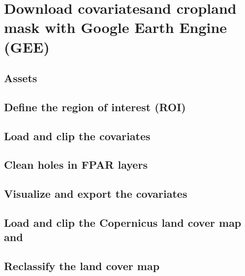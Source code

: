 \documentclass[
  10pt,
  b5paper,
  oneside]{book}
\begin{document}
\hypertarget{download-covariatesand-cropland-mask-with-google-earth-engine-gee}{%
\section{Download covariatesand cropland mask with Google Earth Engine (GEE)}\label{download-covariatesand-cropland-mask-with-google-earth-engine-gee}}

\hypertarget{assets}{%
\subsection{Assets}\label{assets}}

\hypertarget{define-the-region-of-interest-roi}{%
\subsection{Define the region of interest (ROI)}\label{define-the-region-of-interest-roi}}

\hypertarget{load-and-clip-the-covariates}{%
\subsection{Load and clip the covariates}\label{load-and-clip-the-covariates}}

\hypertarget{clean-holes-in-fpar-layers}{%
\subsection{Clean holes in FPAR layers}\label{clean-holes-in-fpar-layers}}

\hypertarget{visualize-and-export-the-covariates}{%
\subsection{Visualize and export the covariates}\label{visualize-and-export-the-covariates}}

\hypertarget{load-and-clip-the-copernicus-land-cover-map-and}{%
\subsection{Load and clip the Copernicus land cover map and}\label{load-and-clip-the-copernicus-land-cover-map-and}}

\hypertarget{reclassify-the-land-cover-map}{%
\subsection{Reclassify the land cover map}\label{reclassify-the-land-cover-map}}
\end{document}
